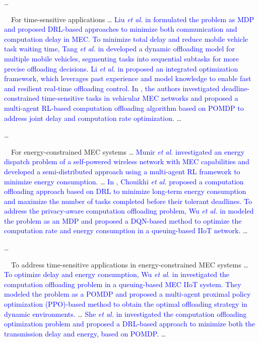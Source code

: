\documentclass[12pt,draftclsnofoot,onecolumn]{IEEEtran}
\newenvironment{my}[2]%
{\begin{list}{}%
{\setlength{\rightmargin}{#1}\setlength{\leftmargin}{#2}}%


 \item[]{}

} {\end{list}}
\begin{document}
\begin{enumerate}
\begin{my}{1cm}{1cm}
{{	\dots
	
		\,\,\,\, For time-sensitive applications \dots \textcolor{blue}{ Liu \textit{et al.} in \cite{liu2022deep} formulated the problem as MDP and proposed DRL-based approaches to minimize both communication and computation delay in MEC.
		To minimize total delay and reduce mobile vehicle task waiting time, Tang \textit{et al.} in \cite{tang2022double} developed a dynamic offloading model for multiple mobile vehicles, segmenting tasks into sequential subtasks for more precise offloading decisions.
		Li \textit{et al.} in \cite{li2022integrated} proposed an integrated optimization framework, which leverages past experience and model knowledge to enable fast and resilient real-time offloading control. 
		In \cite{wei2023many}, the authors investigated deadline-constrained time-sensitive tasks in vehicular MEC networks and proposed a multi-agent RL-based computation offloading algorithm based on POMDP to address joint delay and computation rate optimization. }	\dots
	
	\dots
	
	\,\,\,\,
	For energy-constrained MEC systems \dots \textcolor{blue}{ Munir \textit{et al.} \cite{munir2021multi}  investigated an energy dispatch problem of a self-powered wireless network with MEC capabilities and developed a semi-distributed approach using a multi-agent RL framework to minimize energy consumption. }\dots
	\textcolor{blue}{ In \cite{chouikhi2023energy}, Chouikhi \textit{et al.} proposed a computation offloading approach based on DRL to minimize long-term energy consumption and maximize the number of tasks completed before their tolerant deadlines.
	To address the privacy-aware computation offloading problem, Wu \textit{et al.} in \cite{wu2024combining} modeled the problem as an MDP and proposed a DQN-based method to optimize the computation rate and energy consumption in a queuing-based IIoT network.} \dots

	\dots

\,\,\,\,
To address time-sensitive applications in energy-constrained MEC systems \dots
\textcolor{blue}{ To optimize delay and energy consumption, Wu \textit{et al.} in \cite{wu2023multi} investigated the computation offloading problem in a queuing-based MEC IIoT system. They modeled the problem as a POMDP and proposed a multi-agent proximal policy optimization (PPO)-based method to obtain the optimal offloading strategy in dynamic environments.} \dots
\textcolor{blue}{ She \textit{et al.} in \cite{she2024efficient} investigated the computation offloading optimization problem and proposed a DRL-based approach to minimize both the transmission delay and energy, based on POMDP.} \dots

}}
\end{my}
\end{enumerate}
\end{document}
